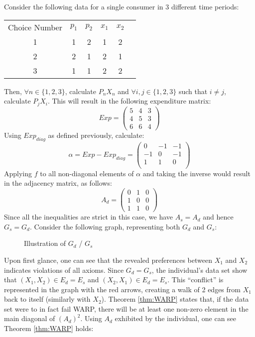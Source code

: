 \documentclass{article} %
\begin{document}
Consider the following data for a single consumer in 3 different time periods:
\begin{center}
\begin{tabular}{ cccccc } 
Choice Number & $p_{1}$ & $p_{2}$ & $x_{1}$ & $x_{2}$ \\
1&1&2&1&2 \\
2&2&1&2&1 \\
3&1&1&2&2
\end{tabular}
\end{center}
Then, $\forall n\in\{1,2,3\}$, calculate $P_{n}X_{n}$ and $\forall i,j\in\{1,2,3\}$ such that $i\not=j$, calculate $P_{j}X_{i}$. This will result in the following expenditure matrix:
\[
Exp = \begin{pmatrix}
5&4&3 \\
4&5&3 \\
6&6&4
\end{pmatrix}
\]
Using $Exp_{diag}$ as defined previously, calculate:
\[\alpha=Exp-Exp_{diag}=\begin{pmatrix}
0 &-1 &-1\\
-1&0&-1\\
1&1&0\\
\end{pmatrix}
\]
Applying $f$ to all non-diagonal elements of $\alpha$ and taking the inverse would result in the adjacency matrix, as follows:
\[
A_d=\begin{pmatrix}
0 & 1 & 0\\
1 & 0 &0 \\
1 & 1 & 0
\end{pmatrix}
\]
Since all the inequalities are strict in this case, we have $A_s=A_d$ and hence $G_s=G_d$. Consider the following graph, representing both $G_d$ and $G_s$:
\begin{figure}[H]
\centering
{}
\caption{Illustration of $G_d$ / $G_s$} \label{fig:example1_graph}
\end{figure}
Upon first glance, one can see that the revealed preferences between $X_1$ and $X_2$ indicates violations of all axioms. Since $G_d=G_s$, the individual's data set show that $(X_1,X_2)\in E_d = E_s$ and $(X_2,X_1)\in E_d=E_s$. This ``conflict'' is represented in the graph with the red arrows, creating a walk of 2 edges from $X_1$ back to itself (similarly with $X_2$). Theorem \ref{thm:WARP} states that, if the data set were to in fact fail WARP, there will be at least one non-zero element in the main diagonal of $(A_d)^2$. Using $A_d$ exhibited by the individual, one can see Theorem \ref{thm:WARP} holds:
\end{document}
